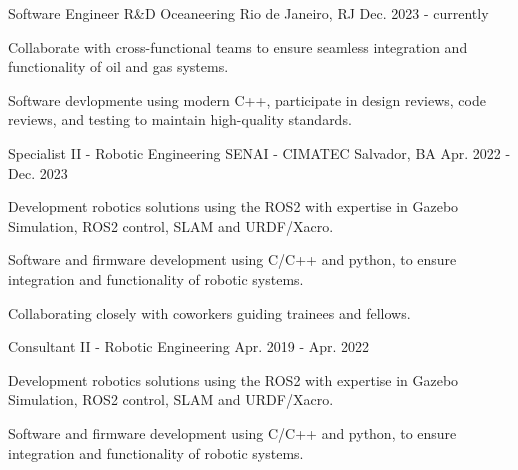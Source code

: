

\begin{cventries}

\cventry
  {Software Engineer R\&D} %
  {Oceaneering} %
  {Rio de Janeiro, RJ} %
  {Dec. 2023 - currently} %
  {
    \begin{cvitems} %
      \item {Collaborate with cross-functional teams to ensure seamless integration and functionality of oil and gas systems.}
      \item {Software devlopmente using modern C++, participate in design reviews, code reviews, and testing to maintain high-quality standards.}
    \end{cvitems}
  }

\cventry
  {Specialist II - Robotic Engineering} %
  {SENAI - CIMATEC} %
  {Salvador, BA} %
  {Apr. 2022 - Dec. 2023} %
  {
    \begin{cvitems} %
      \item {Development robotics solutions using the ROS2 with expertise in Gazebo Simulation, ROS2 control, SLAM and URDF/Xacro.}
      \item {Software and firmware development using C/C++ and python, to ensure integration and functionality of robotic systems.}
      \item {Collaborating closely with coworkers guiding trainees and fellows.}
    \end{cvitems}
  }

\cventry
  {Consultant II - Robotic Engineering} %
  {} %
  {} %
  {Apr. 2019 - Apr. 2022} %
  {
    \begin{cvitems} %
      \item {Development robotics solutions using the ROS2 with expertise in Gazebo Simulation, ROS2 control, SLAM and URDF/Xacro.}
      \item {Software and firmware development using C/C++ and python, to ensure integration and functionality of robotic systems.}
    \end{cvitems}
  }


\end{cventries}
